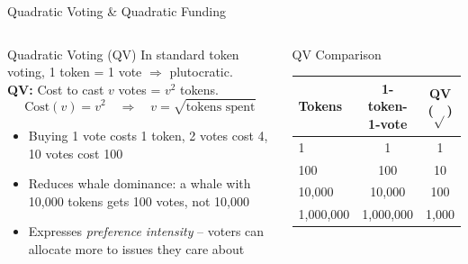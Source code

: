 \documentclass[8pt,aspectratio=169]{beamer}
\begin{document}
\begin{frame}{Quadratic Voting \& Quadratic Funding}
\begin{columns}[T]
\begin{block}{Quadratic Voting (QV)}
\footnotesize
In standard token voting, 1 token = 1 vote $\Rightarrow$ plutocratic.\\[1mm]
\textbf{QV:} Cost to cast $v$ votes = $v^2$ tokens.
\[
\text{Cost}(v) = v^2 \quad \Rightarrow \quad v = \sqrt{\text{tokens spent}}
\]
\begin{itemize}
  \item Buying 1 vote costs 1 token, 2 votes cost 4, 10 votes cost 100
  \item Reduces whale dominance: a whale with 10,000 tokens gets 100 votes, not 10,000
  \item Expresses \emph{preference intensity} -- voters can allocate more to issues they care about
\end{itemize}
\end{block}
\vspace{1mm}
\begin{exampleblock}{\footnotesize QV Comparison}
\footnotesize
\begin{tabular}{lcc}
\toprule
\textbf{Tokens} & \textbf{1-token-1-vote} & \textbf{QV ($\sqrt{}$)} \\
\midrule
1 & 1 & 1 \\
100 & 100 & 10 \\
10,000 & 10,000 & 100 \\
1,000,000 & 1,000,000 & 1,000 \\
\bottomrule
\end{tabular}
\end{exampleblock}


\end{columns}
\end{frame}
\end{document}
